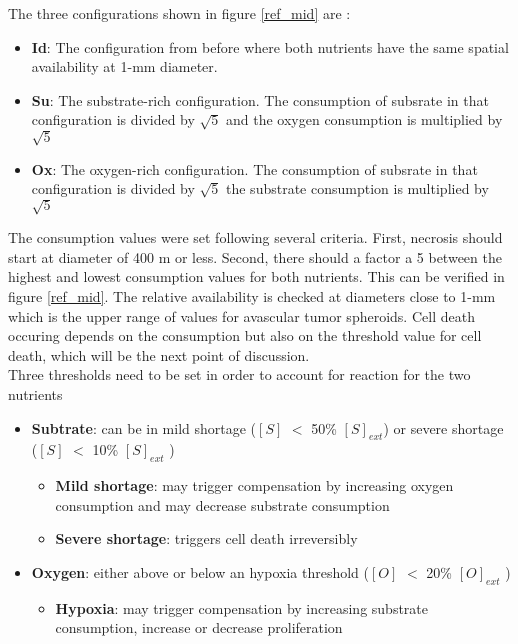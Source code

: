 \documentclass[11pt,a4paper]{article}
\begin{document}
The three configurations shown in figure \ref{ref_mid} are : 
\begin{itemize}
\item \textbf{Id}: The configuration from before where both nutrients have the same spatial availability at 1-mm diameter.
\item \textbf{Su}: The substrate-rich configuration. The consumption of subsrate in that configuration is divided by $\sqrt{5}$ and the oxygen consumption is multiplied by $\sqrt{5}$
\item \textbf{Ox}: The oxygen-rich configuration. The consumption of subsrate in that configuration is divided by $\sqrt{5}$ the substrate consumption is multiplied by $\sqrt{5}$
\end{itemize}


The consumption values were set following several criteria. First, necrosis should start at diameter of 400 \textmu m or less\cite{Freyer1986}\cite{Freyer1988}. Second, there should a factor a 5 between the highest and lowest consumption values for both nutrients.\cite{Kammerer2015} This can be verified in figure \ref{ref_mid}. The relative availability is checked at diameters close to 1-mm which is the upper range of values for avascular tumor spheroids.\cite{Freyer1986}\cite{MullerKlieser1986} Cell death occuring depends on the consumption but also on the threshold value for cell death, which will be the next point of discussion.\\

Three thresholds need to be set in order to account for reaction for the two nutrients
\begin{itemize}
\item \textbf{Subtrate}: can be in mild shortage ($[S]$  $<$ 50\% $[S]_{ext}$) or severe shortage ($[S]$  $<$ 10\% $[S]_{ext}$  )

\begin{itemize}
\item \textbf{Mild shortage}: may trigger compensation by increasing oxygen consumption and may decrease substrate consumption
\item \textbf{Severe shortage}: triggers cell death irreversibly
\end{itemize}

\item  \textbf{Oxygen}: either above or below an hypoxia threshold ($[O]$  $<$ 20\% $[O]_{ext}$ )
\begin{itemize}
\item \textbf{Hypoxia}: may trigger compensation by increasing substrate consumption, increase or decrease proliferation
\end{itemize}
\end{itemize}
\end{document}
